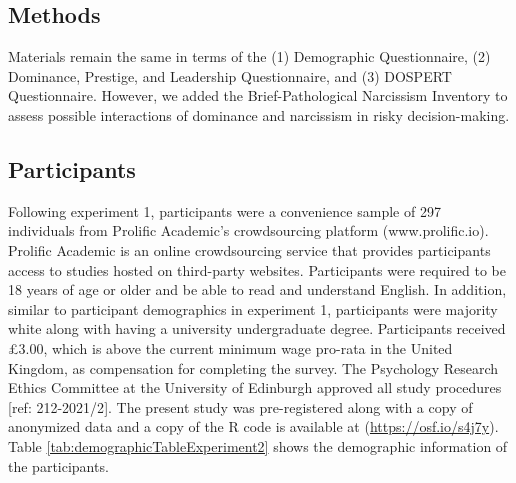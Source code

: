 \documentclass[
  donotrepeattitle,doc, 12pt, a4paper,floatsintext]{apa7}
\begin{document}
\hypertarget{methods-1}{%
\subsection{Methods}\label{methods-1}}

Materials remain the same in terms of the (1) Demographic Questionnaire, (2) Dominance, Prestige, and Leadership Questionnaire, and (3) DOSPERT Questionnaire. However, we added the Brief-Pathological Narcissism Inventory to assess possible interactions of dominance and narcissism in risky decision-making.

\hypertarget{participants}{%
\subsection{Participants}\label{participants}}

Following experiment 1, participants were a convenience sample of 297 individuals from Prolific Academic's crowdsourcing platform (www.prolific.io). Prolific Academic is an online crowdsourcing service that provides participants access to studies hosted on third-party websites. Participants were required to be 18 years of age or older and be able to read and understand English. In addition, similar to participant demographics in experiment 1, participants were majority white along with having a university undergraduate degree. Participants received £3.00, which is above the current minimum wage pro-rata in the United Kingdom, as compensation for completing the survey. The Psychology Research Ethics Committee at the University of Edinburgh approved all study procedures {[}ref: 212-2021/2{]}. The present study was pre-registered along with a copy of anonymized data and a copy of the R code is available at (\url{https://osf.io/s4j7y}). Table \ref{tab:demographicTableExperiment2} shows the demographic information of the participants.
\end{document}
